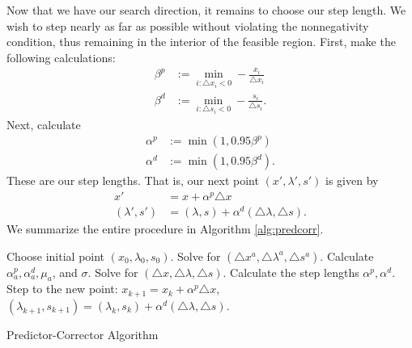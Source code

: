 Now that we have our search direction, it remains to choose our step length. We wish to step nearly as far as possible without
violating the nonnegativity condition, thus remaining in the interior of the feasible region. First, make the following
calculations:
\begin{align*}
\beta^p &:= \displaystyle\min_{i : \triangle x_i < 0}-\frac{x_i}{\triangle x_i}\\
\beta^d &:= \displaystyle\min_{i : \triangle s_i < 0}-\frac{s_i}{\triangle s_i}.
\end{align*}
Next, calculate
\begin{align*}
\alpha^p &:= \min(1, 0.95\beta^p)\\
\alpha^d &:= \min(1, 0.95\beta^d).
\end{align*}
These are our step lengths. That is, our next point $(x', \lambda', s')$ is given by
\begin{align*}
x' &= x + \alpha^p\triangle x\\
(\lambda', s') &= (\lambda, s) + \alpha^d(\triangle \lambda, \triangle s).
\end{align*}
We summarize the entire procedure in Algorithm \ref{alg:predcorr}.
\begin{algorithm}
\begin{algorithmic}[1]
    \State \textrm{Choose initial point } $(x_0, \lambda_0, s_0)$.
        \State \textrm{Solve for } $(\triangle x^a, \triangle \lambda^a, \triangle s^a)$.
        \State \textrm{Calculate } $\alpha_a^p, \alpha_a^d, \mu_a$, \textrm{and} $\sigma$.
        \State \textrm{Solve for } $(\triangle x, \triangle \lambda, \triangle s)$.
        \State \textrm{Calculate the step lengths } $\alpha^p, \alpha^d$.
        \State \textrm{Step to the new point: } $x_{k+1} = x_k + \alpha^p\triangle x$, 
        $(\lambda_{k+1}, s_{k+1}) = (\lambda_k, s_k) + \alpha^d(\triangle \lambda, \triangle s)$.
    \EndFor
\EndProcedure
\end{algorithmic}
\caption{Predictor-Corrector Algorithm}
\label{alg:predcorr}
\end{algorithm}

